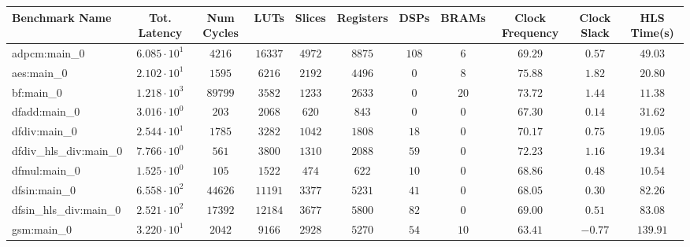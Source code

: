 \begin{tabular}{|l|c|c|c|c|c|c|c|c|c|c|}
\hline
Benchmark Name          & Tot. Latency           & Num Cycles & LUTs      & Slices    & Registers & DSPs    & BRAMs   & Clock Frequency & Clock Slack & HLS Time(s) \\
\hline
adpcm:main\_0           & $ 6.085 \cdot 10^{1} $ & $ 4216   $ & $ 16337 $ & $ 4972  $ & $ 8875  $ & $ 108 $ & $ 6   $ & $ 69.29       $ & $ 0.57    $ & $ 49.03   $ \\
aes:main\_0             & $ 2.102 \cdot 10^{1} $ & $ 1595   $ & $ 6216  $ & $ 2192  $ & $ 4496  $ & $ 0   $ & $ 8   $ & $ 75.88       $ & $ 1.82    $ & $ 20.80   $ \\
bf:main\_0              & $ 1.218 \cdot 10^{3} $ & $ 89799  $ & $ 3582  $ & $ 1233  $ & $ 2633  $ & $ 0   $ & $ 20  $ & $ 73.72       $ & $ 1.44    $ & $ 11.38   $ \\
dfadd:main\_0           & $ 3.016 \cdot 10^{0} $ & $ 203    $ & $ 2068  $ & $ 620   $ & $ 843   $ & $ 0   $ & $ 0   $ & $ 67.30       $ & $ 0.14    $ & $ 31.62   $ \\
dfdiv:main\_0           & $ 2.544 \cdot 10^{1} $ & $ 1785   $ & $ 3282  $ & $ 1042  $ & $ 1808  $ & $ 18  $ & $ 0   $ & $ 70.17       $ & $ 0.75    $ & $ 19.05   $ \\
dfdiv\_hls\_div:main\_0 & $ 7.766 \cdot 10^{0} $ & $ 561    $ & $ 3800  $ & $ 1310  $ & $ 2088  $ & $ 59  $ & $ 0   $ & $ 72.23       $ & $ 1.16    $ & $ 19.34   $ \\
dfmul:main\_0           & $ 1.525 \cdot 10^{0} $ & $ 105    $ & $ 1522  $ & $ 474   $ & $ 622   $ & $ 10  $ & $ 0   $ & $ 68.86       $ & $ 0.48    $ & $ 10.54   $ \\
dfsin:main\_0           & $ 6.558 \cdot 10^{2} $ & $ 44626  $ & $ 11191 $ & $ 3377  $ & $ 5231  $ & $ 41  $ & $ 0   $ & $ 68.05       $ & $ 0.30    $ & $ 82.26   $ \\
dfsin\_hls\_div:main\_0 & $ 2.521 \cdot 10^{2} $ & $ 17392  $ & $ 12184 $ & $ 3677  $ & $ 5800  $ & $ 82  $ & $ 0   $ & $ 69.00       $ & $ 0.51    $ & $ 83.08   $ \\
gsm:main\_0             & $ 3.220 \cdot 10^{1} $ & $ 2042   $ & $ 9166  $ & $ 2928  $ & $ 5270  $ & $ 54  $ & $ 10  $ & $ 63.41       $ & $ -0.77   $ & $ 139.91  $ \\

\end{tabular}
